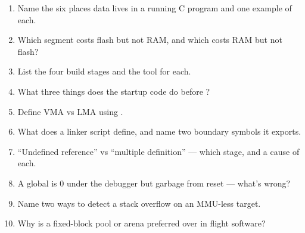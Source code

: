 \begin{scorecard}
\begin{enumerate}
\item Name the six places data lives in a running C program and one example of
  each.
\item Which segment costs flash but not RAM, and which costs RAM but not flash?
\item List the four build stages and the tool for each.
\item What three things does the startup code do before ?
\item Define VMA vs LMA using .
\item What does a linker script define, and name two boundary symbols it
  exports.
\item ``Undefined reference'' vs ``multiple definition'' --- which stage, and a
  cause of each.
\item A global is 0 under the debugger but garbage from reset --- what's wrong?
\item Name two ways to detect a stack overflow on an MMU-less target.
\item Why is a fixed-block pool or arena preferred over  in flight
  software?
\end{enumerate}
\end{scorecard}


